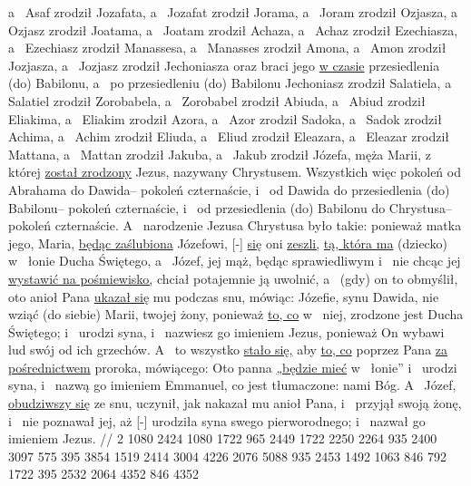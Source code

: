  a~ Asaf zrodził Jozafata, a~ Jozafat zrodził Jorama, a~ Joram zrodził Ozjasza,
 a~ Ozjasz zrodził Joatama, a~ Joatam zrodził Achaza, a~ Achaz zrodził Ezechiasza,
 a~ Ezechiasz zrodził Manassesa, a~ Manasses zrodził Amona, a~ Amon zrodził Jozjasza,
 a~ Jozjasz zrodził Jechoniasza oraz braci jego \underline{w czasie} przesiedlenia (do) Babilonu,
 a~ po przesiedleniu (do) Babilonu Jechoniasz zrodził Salatiela, a~ Salatiel zrodził Zorobabela,
 a~ Zorobabel zrodził Abiuda, a~ Abiud zrodził Eliakima, a~ Eliakim zrodził Azora,
 a~ Azor zrodził Sadoka, a~ Sadok zrodził Achima, a~ Achim zrodził Eliuda,
 a~ Eliud zrodził Eleazara, a~ Eleazar zrodził Mattana, a~ Mattan zrodził Jakuba,
 a~ Jakub zrodził Józefa, męża Marii, z~ której \underline{został zrodzony} Jezus, nazywany Chrystusem.
 Wszystkich więc pokoleń od Abrahama do Dawida– pokoleń czternaście, i~ od Dawida do przesiedlenia (do) Babilonu– pokoleń czternaście, i~ od przesiedlenia (do) Babilonu do Chrystusa– pokoleń czternaście.
 A~ narodzenie Jezusa Chrystusa było takie: ponieważ matka jego, Maria, \underline{będąc zaślubiona} Józefowi,  [-] \underline{się} oni \underline{zeszli,}  \underline{tą, która ma} (dziecko) w~ łonie  Ducha Świętego,
 a~ Józef, jej mąż, będąc sprawiedliwym i~ nie chcąc jej \underline{wystawić na pośmiewisko,} chciał potajemnie ją uwolnić,
 a~ (gdy) on to obmyślił, oto anioł Pana \underline{ukazał się} mu podczas snu, mówiąc: Józefie, synu Dawida, nie  wziąć (do siebie) Marii, twojej żony, ponieważ \underline{to, co} w~ niej, zrodzone jest  Ducha Świętego;
 i~ urodzi syna, i~ nazwiesz go imieniem Jezus, ponieważ On wybawi lud swój od ich grzechów.
 A~ to wszystko \underline{stało się,} aby  \underline{to, co}  poprzez Pana \underline{za pośrednictwem} proroka, mówiącego:
 Oto panna \underline{„będzie mieć} w~ łonie” i~ urodzi syna, i~ nazwą go imieniem Emmanuel, co jest tłumaczone:  nami Bóg.
 A~ Józef, \underline{obudziwszy się} ze snu, uczynił, jak nakazał mu anioł Pana, i~ przyjął swoją żonę,
 i~ nie poznawał jej, aż [-] urodziła syna swego pierworodnego; i~ nazwał go imieniem Jezus.
//
\endgl
\begingl
\lettrine[loversize=1,lraise=-1.3]{2 }{}%
 1080 2424 1080 1722 965 2449 1722 2250 2264 935 2400 3097 575 395 3854 1519 2414
{} 3004 4226 2076 {} 5088 935 2453 1492 1063 846 792 1722 395 2532 2064 4352 846 4352
